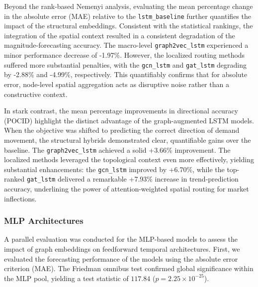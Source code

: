 Beyond the rank-based Nemenyi analysis, evaluating the mean percentage change in the absolute error (MAE) relative to the \texttt{lstm\_baseline} further quantifies the impact of the structural embeddings. Consistent with the statistical rankings, the integration of the spatial context resulted in a consistent degradation of the magnitude-forecasting accuracy. The macro-level \texttt{graph2vec\_lstm} experienced a minor performance decrease of -1.97\%. However, the localized routing methods suffered more substantial penalties, with the \texttt{gcn\_lstm} and \texttt{gat\_lstm} degrading by -2.88\% and -4.99\%, respectively. This quantifiably confirms that for absolute error, node-level spatial aggregation acts as disruptive noise rather than a constructive context.

In stark contrast, the mean percentage improvements in directional accuracy (POCID) highlight the distinct advantage of the graph-augmented LSTM models. When the objective was shifted to predicting the correct direction of demand movement, the structural hybrids demonstrated clear, quantifiable gains over the baseline. The \texttt{graph2vec\_lstm} achieved a solid +3.66\% improvement. The localized methods leveraged the topological context even more effectively, yielding substantial enhancements: the \texttt{gcn\_lstm} improved by +6.70\%, while the top-ranked \texttt{gat\_lstm} delivered a remarkable +7.93\% increase in trend-prediction accuracy, underlining the power of attention-weighted spatial routing for market inflections.

\subsubsection{MLP Architectures}
\label{subsubsec:spearman_mlp}

A parallel evaluation was conducted for the MLP-based models to assess the impact of graph embeddings on feedforward temporal architectures. First, we evaluated the forecasting performance of the models using the absolute error criterion (MAE). The Friedman omnibus test confirmed global significance within the MLP pool, yielding a test statistic of $117.84$ ($p = 2.25 \times 10^{-25}$).

